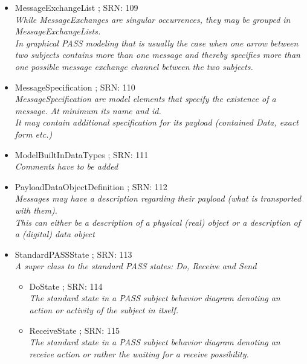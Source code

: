 \begin{itemize}
\begin{itemize}
\begin{itemize}
{					These are the typical conditions defined by Receive Transitions.}
				\item SendTransitionCondition ; SRN: 108 \\ \textit{SendTransitionConditions are conditions that state that a certain message must have been successfully passed to another subjects in-box to be fulfilled.\\
					These are the typical conditions defined by Send transitions.}
			\end{itemize} 
			\item MessageExchangeList ; SRN: 109 \\ \textit{While MessageExchanges are singular occurrences, they may be grouped in MessageExchangeLists.\\
				In graphical PASS modeling that is usually the case when one arrow between two subjects contains more than one message and thereby specifies more than one possible message exchange channel between the two subjects.}
			\item MessageSpecification ; SRN: 110 \\ \textit{MessageSpecification are model elements that specify the existence of a message. At minimum its name and id.\\
				It may contain additional specification for its payload (contained Data, exact form etc.)}
			\item ModelBuiltInDataTypes ; SRN: 111 \\ \textit{Comments have to be added}
			\item PayloadDataObjectDefinition ; SRN: 112 \\ \textit{Messages may have a description regarding their payload (what is transported with them).\\
				This can either be a description of a physical (real) object or a description of a (digital) data object}
			\item StandardPASSState ; SRN: 113 \\ \textit{A super class to the standard PASS states: Do, Receive and Send}
			\begin{itemize}
				\item DoState ; SRN: 114 \\ \textit{The standard state in a PASS subject behavior diagram denoting an action or activity of the subject in itself.}
				\item ReceiveState ; SRN: 115 \\ \textit{The standard state in a PASS subject behavior diagram denoting an receive action or rather the waiting for a receive possibility.}

\end{itemize}
\end{itemize}
\end{itemize}
